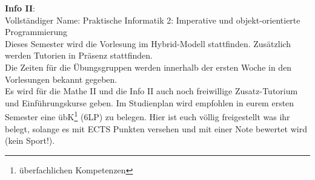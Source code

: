 \textbf{Info II}:\\
Vollständiger Name: Praktische Informatik 2: Imperative und objekt-orientierte Programmierung\\
Dieses Semester wird die Vorlesung im Hybrid-Modell stattfinden. Zusätzlich werden Tutorien in Präsenz stattfinden.\\

Die Zeiten für die Übungsgruppen werden innerhalb der ersten Woche in den Vorlesungen bekannt gegeben.\\
Es wird für die Mathe II und die Info II auch noch freiwillige Zusatz-Tutorium und Einführungskurse geben.
Im Studienplan wird empfohlen in eurem ersten Semester eine übK\footnote{überfachlichen Kompetenzen} (6LP) zu belegen. Hier ist euch völlig freigestellt was ihr belegt, solange es mit ECTS Punkten versehen und mit einer Note bewertet wird (kein Sport!).
